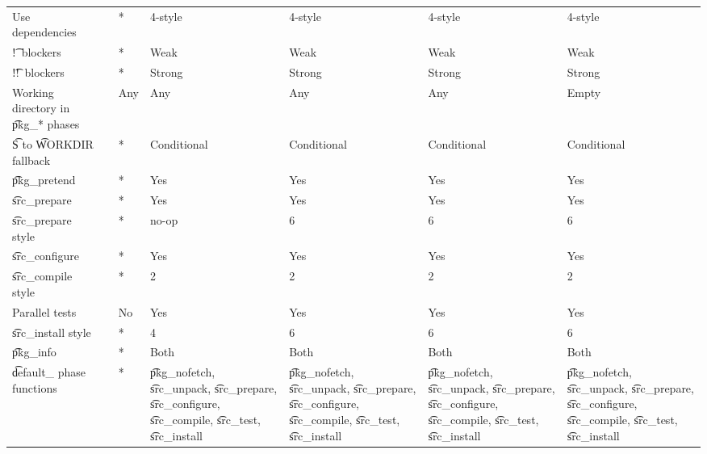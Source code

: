 \begin{landscape}
\begin{longtable}{llP{7.5em}P{7.5em}P{7.5em}P{7.5em}P{7.5em}}
Use dependencies &  &
    * & 4-style & 4-style & 4-style & 4-style \\

\t{!}\ blockers &  &
    * & Weak & Weak & Weak & Weak \\

\t{!!}\ blockers &  &
    * & Strong & Strong & Strong & Strong \\

Working directory in \t{pkg_*} phases &  &
    Any & Any & Any & Any & Empty \\

\t{S} to \t{WORKDIR} fallback &  &
    * & Conditional & Conditional & Conditional & Conditional \\

\t{pkg_pretend} &  &
    * & Yes & Yes & Yes & Yes \\

\t{src_prepare} &  &
    * & Yes & Yes & Yes & Yes \\

\t{src_prepare} style &  &
    * & no-op & 6 & 6 & 6 \\

\t{src_configure} &  &
    * & Yes & Yes & Yes & Yes \\

\t{src_compile} style &  &
    * & 2 & 2 & 2 & 2 \\

Parallel tests &  &
    No & Yes & Yes & Yes & Yes \\

\t{src_install} style &  &
    * & 4 & 6 & 6 & 6 \\

\t{pkg_info} &  &
    * & Both & Both & Both & Both \\

\t{default_} phase functions &  &
    * &
    \t{pkg_nofetch}, \t{src_unpack}, \t{src_prepare}, \t{src_configure},
        \t{src_compile}, \t{src_test}, \t{src_install} &
    \t{pkg_nofetch}, \t{src_unpack}, \t{src_prepare}, \t{src_configure},
        \t{src_compile}, \t{src_test}, \t{src_install} &
    \t{pkg_nofetch}, \t{src_unpack}, \t{src_prepare}, \t{src_configure},
        \t{src_compile}, \t{src_test}, \t{src_install} &
    \t{pkg_nofetch}, \t{src_unpack}, \t{src_prepare}, \t{src_configure},
        \t{src_compile}, \t{src_test}, \t{src_install} \\


\end{longtable}
\end{landscape}
